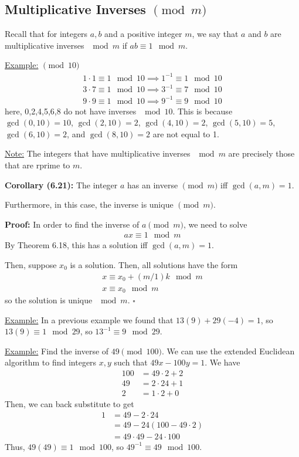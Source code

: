 \documentclass{article}
\newcommand*{\qed}{\hfill$\square$}%
\begin{document}
\subsection{Multiplicative Inverses $\pmod m$}

Recall that for integers $a,b$ and a positive integer $m$, we say that $a$ and $b$ are multiplicative inverses $\mod m$ if $ab\equiv 1\mod m$.

\underline{Example:} $\pmod 10$ \begin{align*}
    1\cdot 1\equiv 1\mod 10\implies 1^{-1}\equiv 1\mod 10\\
    3\cdot 7\equiv 1\mod 10\implies 3^{-1}\equiv 7\mod 10\\
    9\cdot 9\equiv 1\mod 10\implies 9^{-1}\equiv 9\mod 10
\end{align*}
here, 0,2,4,5,6,8 do not have inverses $\mod 10$. This is because $\gcd(0,10)=10$, $\gcd(2,10)=2$, $\gcd(4,10)=2$, $\gcd(5,10)=5$, $\gcd(6,10)=2$, and $\gcd(8,10)=2$ are not equal to 1.

\underline{Note:} The integers that have multiplicative inverses $\mod m$ are precisely those that are rprime to $m$.

\textbf{Corollary (6.21):} The integer $a$ has an inverse $\pmod m$ iff $\gcd(a,m)=1$.

Furthermore, in this case, the inverse is unique $\pmod m$.

\textbf{Proof:} In order to find the inverse of $a\pmod m$, we need to solve \begin{align*}
    ax\equiv 1\mod m
\end{align*}By Theorem 6.18, this has a solution iff $\gcd(a,m)=1$. 

Then, suppose $x_0$ is a solution. Then, all solutions have the form \begin{align*}
    x\equiv x_0+(m/1)k\mod m\\
    x\equiv x_0\mod m
\end{align*}so the solution is unique $\mod m$. \qed

\underline{Example:} In a previous example we found that $13(9)+29(-4)=1$, so $13(9)\equiv 1\mod 29$, so $13^{-1}\equiv 9\mod 29$.

\underline{Example:} Find the inverse of $49\pmod{100}$. We can use the extended Euclidean algorithm to find integers $x,y$ such that $49x-100y=1$. We have \begin{align*}
    100&=49\cdot 2+2\\
    49&=2\cdot 24+1\\
    2&=1\cdot 2+0
\end{align*}Then, we can back substitute to get \begin{align*}
    1&=49-2\cdot 24\\
    &=49-24(100-49\cdot 2)\\
    &=49\cdot 49-24\cdot 100
\end{align*}Thus, $49(49)\equiv 1\mod 100$, so $49^{-1}\equiv 49\mod 100$.
\end{document}
